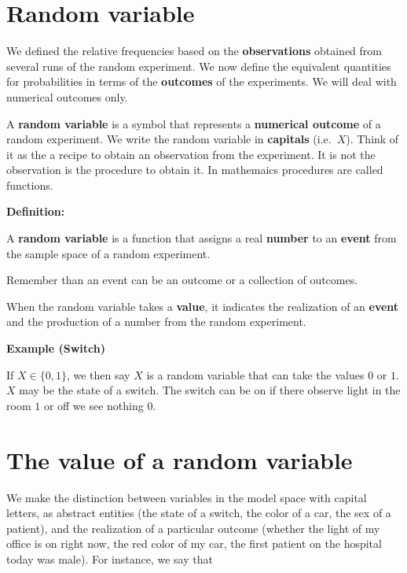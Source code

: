 \documentclass[
]{book}
\begin{document}
\hypertarget{random-variable}{%
\section{Random variable}\label{random-variable}}

We defined the relative frequencies based on the \textbf{observations} obtained from several runs of the random experiment. We now define the equivalent quantities for probabilities in terms of the \textbf{outcomes} of the experiments. We will deal with numerical outcomes only.

A \textbf{random variable} is a symbol that represents a \textbf{numerical outcome} of a random experiment. We write the random variable in \textbf{capitals} (i.e.~\(X\)). Think of it as the a recipe to obtain an observation from the experiment. It is not the observation is the procedure to obtain it. In mathemaics procedures are called functions.

\textbf{Definition:}

A \textbf{random variable} is a function that assigns a real \textbf{number} to an \textbf{event} from the sample space of a random experiment.

Remember than an event can be an outcome or a collection of outcomes.

When the random variable takes a \textbf{value}, it indicates the realization of an \textbf{event} and the production of a number from the random experiment.

\textbf{Example (Switch)}

If \(X \in \{0,1\}\), we then say \(X\) is a random variable that can take the values \(0\) or \(1\). \(X\) may be the state of a switch. The switch can be on if there observe light in the room \(1\) or off we see nothing \(0\).

\hypertarget{the-value-of-a-random-variable}{%
\section{The value of a random variable}\label{the-value-of-a-random-variable}}

We make the distinction between variables in the model space with capital letters, as abstract entities (the state of a switch, the color of a car, the sex of a patient), and the realization of a particular outcome (whether the light of my office is on right now, the red color of my car, the first patient on the hospital today was male). For instance, we say that
\end{document}
